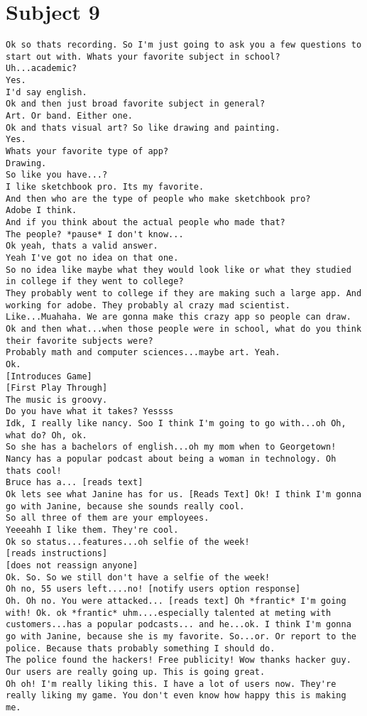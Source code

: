 \clearpage\section*{Subject 9}
\begin{lstlisting}
Ok so thats recording. So I'm just going to ask you a few questions to start out with. Whats your favorite subject in school?
Uh...academic?
Yes.
I'd say english.
Ok and then just broad favorite subject in general?
Art. Or band. Either one.
Ok and thats visual art? So like drawing and painting.
Yes.
Whats your favorite type of app?
Drawing.
So like you have...?
I like sketchbook pro. Its my favorite.
And then who are the type of people who make sketchbook pro?
Adobe I think.
And if you think about the actual people who made that?
The people? *pause* I don't know...
Ok yeah, thats a valid answer.
Yeah I've got no idea on that one.
So no idea like maybe what they would look like or what they studied in college if they went to college?
They probably went to college if they are making such a large app. And working for adobe. They probably al crazy mad scientist. Like...Muahaha. We are gonna make this crazy app so people can draw.
Ok and then what...when those people were in school, what do you think their favorite subjects were?
Probably math and computer sciences...maybe art. Yeah.
Ok.
[Introduces Game]
[First Play Through]
The music is groovy.
Do you have what it takes? Yessss
Idk, I really like nancy. Soo I think I'm going to go with...oh Oh, what do? Oh, ok.
So she has a bachelors of english...oh my mom when to Georgetown! Nancy has a popular podcast about being a woman in technology. Oh thats cool!
Bruce has a... [reads text]
Ok lets see what Janine has for us. [Reads Text] Ok! I think I'm gonna go with Janine, because she sounds really cool.
So all three of them are your employees.
Yeeeahh I like them. They're cool.
Ok so status...features...oh selfie of the week!
[reads instructions]
[does not reassign anyone]
Ok. So. So we still don't have a selfie of the week!
Oh no, 55 users left....no! [notify users option response]
Oh. Oh no. You were attacked... [reads text] Oh *frantic* I'm going with! Ok. ok *frantic* uhm....especially talented at meting with customers...has a popular podcasts... and he...ok. I think I'm gonna go with Janine, because she is my favorite. So...or. Or report to the police. Because thats probably something I should do. 
The police found the hackers! Free publicity! Wow thanks hacker guy.
Our users are really going up. This is going great.
Oh oh! I'm really liking this. I have a lot of users now. They're really liking my game. You don't even know how happy this is making me. 

\end{lstlisting}
